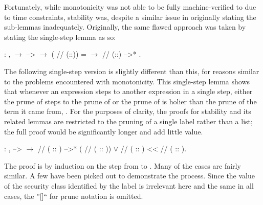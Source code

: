 \documentclass[12pt]{report}
\begin{document}
 Fortunately, while monotonicity was not able to be fully
machine-verified to due to time constraints, stability was, despite
a similar issue in originally stating the sub-lemmas
inadequately. Originally, the same flawed approach was taken by
stating the single-step lemma as so: \begin{coqdoccode}
\coqdocemptyline
\coqdocindent{1.00em}
  : \coqdockw{\ensuremath{\forall}}   ,\coqdoceol
\coqdocindent{2.00em}
  \ensuremath{\rightarrow}\coqdoceol
\coqdocindent{2.00em}
 -->  \ensuremath{\rightarrow}\coqdoceol
\coqdocindent{2.00em}
(  //\coqdocvar{\_} (::)) =  \ensuremath{\rightarrow}\coqdoceol
\coqdocindent{2.00em}
  //\coqdocvar{\_} (::) -->* .\coqdoceol
\coqdocemptyline
\end{coqdoccode}
The following single-step version is slightly different than
this, for reasons similar to the problems encountered with
    monotonicity. This single-step lemma shows that whenever an
    expression  steps to another expression  in a single step,
    either the prune of  steps to the prune of  or the prune of
     is holier than the prune of the term it came from, . For
    the purposes of clarity, the proofs for stability and its related
    lemmas are restricted to the pruning of a single label rather
    than a list; the full proof would be significantly longer and add
    little value. \begin{coqdoccode}
\coqdocemptyline
\coqdocindent{1.00em}
  : \coqdockw{\ensuremath{\forall}}   ,\coqdoceol
\coqdocindent{2.00em}
 -->  \ensuremath{\rightarrow}\coqdoceol
\coqdocindent{2.00em}
  //\coqdocvar{\_} ( :: ) -->* (  //\coqdocvar{\_} ( :: ))\coqdoceol
\coqdocindent{2.00em}
\ensuremath{\lor}\coqdoceol
\coqdocindent{2.00em}
  //\coqdocvar{\_} ( :: ) <<   //\coqdocvar{\_} ( :: ).\coqdoceol
\coqdocemptyline
\end{coqdoccode}
The proof is by induction on the step from  to . Many of
the cases are fairly similar. A few have been picked out to
demonstrate the process. Since the value of the security class
identified by the label is irrelevant here and the same in all cases,
the ''\coqdocvar{\_}[]`` for prune notation is omitted. 
\end{document}
